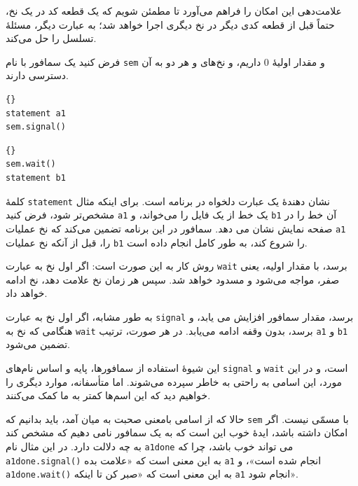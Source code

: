 \documentclass{book}
\begin{document}
علامت‌دهی این امکان را فراهم می‌آورد تا مطمئن شویم که یک قطعه کد در یک نخ، حتماً قبل از قطعه کدی دیگر در نخ دیگری اجرا خواهد شد؛ به عبارت دیگر، مسئلهٔ تسلسل را حل می‌کند.

فرض کنید یک سمافور با نام \texttt{sem} و مقدار اولیهٔ  $0$ داریم، و نخ‌های  و  هر دو به آن دسترسی دارند.

\begin{latin}
\begin{minipage}[t]{2in}
\begin{latin}
\begin{lstlisting}[title=\rl{نخ \lr{A}}]{}
statement a1
sem.signal()
\end{lstlisting}
\end{latin}
\end{minipage}
\hfill
\begin{minipage}[t]{2in}
\begin{latin}
\begin{lstlisting}[title=\rl{نخ \lr{B}}]{}
sem.wait()
statement b1
\end{lstlisting}
\end{latin}
\end{minipage}
\end{latin}

کلمهٔ \texttt{statement} نشان دهندهٔ یک عبارت دلخواه در برنامه است. برای اینکه مثال مشخص‌تر شود، فرض کنید \texttt{a1}
یک خط از یک فایل را می‌خواند، و \texttt{b1} آن خط را در صفحه نمایش نشان می دهد. سمافور در این برنامه تضمین می‌کند که 
نخ  عملیات \texttt{a1} را، قبل از آنکه نخ  عملیات \texttt{b1} را شروع کند، به طور کامل انجام داده است.

روش کار به این صورت است: اگر اول نخ  به عبارت \texttt{wait} برسد، با مقدار اولیه، یعنی صفر، مواجه می‌شود 
و مسدود خواهد شد. سپس هر زمان نخ  علامت دهد، نخ  ادامه خواهد داد.

به طور مشابه، اگر اول نخ  به عبارت \texttt{signal} برسد، مقدار سمافور افزایش می یابد، و هنگامی که نخ  
به \texttt{wait} برسد، بدون وقفه ادامه می‌یابد. در هر صورت، ترتیب \texttt{a1} و \texttt{b1} تضمین می‌شود.

این شیوهٔ استفاده از سمافورها، پایه و اساس نام‌های \texttt{signal} و \texttt{wait} است، 
و در این مورد، این اسامی به راحتی به خاطر سپرده می‌شوند. اما متأسفانه، موارد دیگری را خواهیم دید که این اسم‌ها کمتر به ما کمک می‌کنند.

حالا که از اسامی بامعنی صحبت به میان آمد، باید بدانیم که \texttt{sem} با مسمّی نیست.
اگر امکان داشته باشد، ایدهٔ خوب این است که به یک سمافور نامی دهیم که مشخص کند به چه دلالت دارد. 
در این مثال نام \texttt{a1done} می تواند خوب باشد، چرا که \texttt{ a1done.signal()} 
به این معنی است که «علامت بده \texttt{a1} انجام شده است»، و \texttt{a1done.wait()} 
به این معنی است که «صبر کن تا اینکه \texttt{a1} انجام شود».
\end{document}
